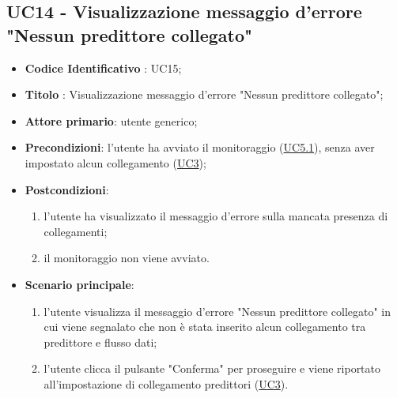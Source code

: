 	\subsection{UC14 - Visualizzazione messaggio d'errore "Nessun predittore collegato"}
		\begin{itemize}
			\item\textbf{Codice Identificativo} : UC15;
			\item\textbf{Titolo} : Visualizzazione messaggio d'errore "Nessun predittore collegato";
			\item\textbf{Attore primario}: utente generico;
			\item\textbf{Precondizioni}: l'utente ha avviato il monitoraggio (\hyperref[par:UC5.1]{UC5.1}), senza aver impostato alcun collegamento (\hyperref[par:UC3]{UC3});
			\item\textbf{Postcondizioni}:
				\begin{enumerate}
					\item l'utente ha visualizzato il messaggio d'errore sulla mancata presenza di collegamenti;	
					\item	il monitoraggio non viene avviato.
				\end{enumerate}
			\item\textbf{Scenario principale}:
				\begin{enumerate}
					\item l'utente visualizza il messaggio d'errore "Nessun predittore collegato" in cui viene segnalato che non è stata inserito alcun collegamento tra predittore e flusso dati;
					\item l'utente clicca il pulsante "Conferma" per proseguire e viene riportato all'impostazione di collegamento predittori (\hyperref[par:UC3]{UC3}).		
				\end{enumerate}		
		\end{itemize}


	








